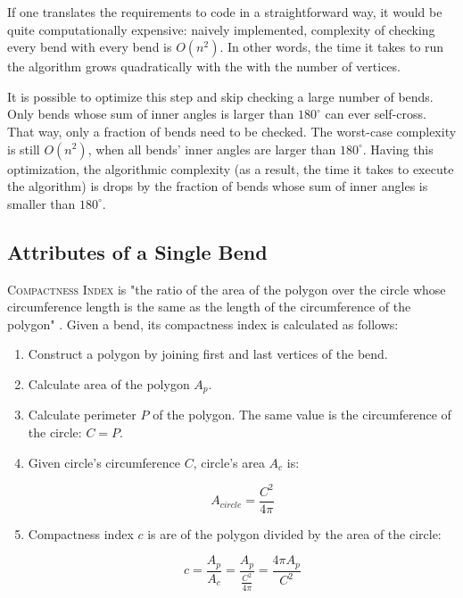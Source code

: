 \documentclass[a4paper]{article}
\begin{document}
If one translates the requirements to code in a straightforward way, it would
be quite computationally expensive: naively implemented, complexity of checking
every bend with every bend is $O(n^2)$. In other words, the time it takes to
run the algorithm grows quadratically with the with the number of vertices.

It is possible to optimize this step and skip checking a large number of bends.
Only bends whose sum of inner angles is larger than $180^\circ$ can ever
self-cross. That way, only a fraction of bends need to be checked. The
worst-case complexity is still $O(n^2)$, when all bends' inner angles are
larger than $180^\circ$. Having this optimization, the algorithmic complexity
(as a result, the time it takes to execute the algorithm) is drops by the
fraction of bends whose sum of inner angles is smaller than $180^\circ$.

\subsection{Attributes of a Single Bend}

\textsc{Compactness Index} is "the ratio of the area of the polygon over the
circle whose circumference length is the same as the length of the
circumference of the polygon" \cite{wang1998line}. Given a bend, its
compactness index is calculated as follows:

\begin{enumerate}

  \item Construct a polygon by joining first and last vertices of the bend.

  \item Calculate area of the polygon $A_{p}$.

  \item Calculate perimeter $P$ of the polygon. The same value is the
      circumference of the circle: $C = P$.

    \item Given circle's circumference $C$, circle's area $A_{c}$ is:

    \[
      A_{circle} = \frac{C^2}{4\pi}
    \]

  \item Compactness index $c$ is are of the polygon divided by the area of the
    circle:

    \[
      c = \frac{A_{p}}{A_{c}} =
        \frac{A_{p}}{ \frac{C^2}{4\pi} } =
        \frac{4\pi A_{p}}{C^2}
    \]

\end{enumerate}
\end{document}
